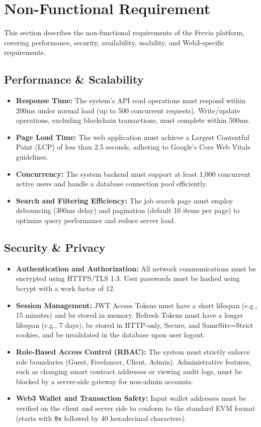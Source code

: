 \section{Non-Functional Requirement}
This section describes the non-functional requirements of the Frevia platform, covering performance, security, availability, usability, and Web3-specific requirements.

\subsection{Performance \& Scalability}
\begin{itemize}
    \item \textbf{Response Time:} The system's API read operations must respond within 200ms under normal load (up to 500 concurrent requests). Write/update operations, excluding blockchain transactions, must complete within 500ms.
    \item \textbf{Page Load Time:} The web application must achieve a Largest Contentful Paint (LCP) of less than 2.5 seconds, adhering to Google's Core Web Vitals guidelines.
    \item \textbf{Concurrency:} The system backend must support at least 1,000 concurrent active users and handle a database connection pool efficiently.
    \item \textbf{Search and Filtering Efficiency:} The job search page must employ debouncing (300ms delay) and pagination (default 10 items per page) to optimize query performance and reduce server load.
\end{itemize}

\subsection{Security \& Privacy}
\begin{itemize}
    \item \textbf{Authentication and Authorization:} All network communications must be encrypted using HTTPS/TLS 1.3. User passwords must be hashed using bcrypt with a work factor of 12.
    \item \textbf{Session Management:} JWT Access Tokens must have a short lifespan (e.g., 15 minutes) and be stored in memory. Refresh Tokens must have a longer lifespan (e.g., 7 days), be stored in HTTP-only, Secure, and SameSite=Strict cookies, and be invalidated in the database upon user logout.
    \item \textbf{Role-Based Access Control (RBAC):} The system must strictly enforce role boundaries (Guest, Freelancer, Client, Admin). Administrative features, such as changing smart contract addresses or viewing audit logs, must be blocked by a server-side gateway for non-admin accounts.
    \item \textbf{Web3 Wallet and Transaction Safety:} Input wallet addresses must be verified on the client and server side to conform to the standard EVM format (starts with \texttt{0x} followed by 40 hexadecimal characters).
\end{itemize}

